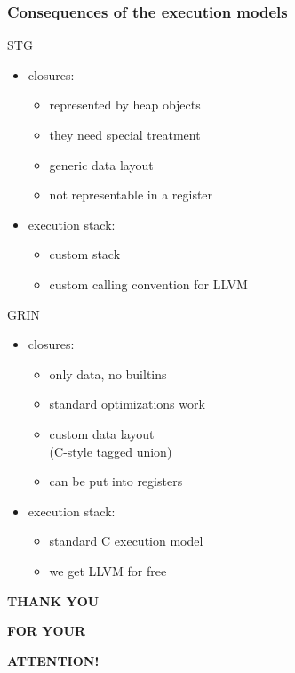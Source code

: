 \documentclass[bigger,aspectratio=169]{beamer}
\begin{document}
\begin{frame}
\frametitle{Consequences of the execution models}

\begin{minipage}{0.45\textwidth}
	\vspace{0.3cm}
	\begin{center}
		STG
	\end{center}
	\begin{itemize}
		\item<1-> closures:
		\begin{itemize}
			\item<2-> represented by heap objects
			\item<3-> they need special treatment
			\item<4-> generic data layout
			\item<5-> not representable in a register
		\end{itemize}
		\item<6-> execution stack:
		\begin{itemize}
			\item<7-> custom stack
			\item<8-> custom calling convention for LLVM
		\end{itemize}
	\end{itemize}
\end{minipage}
\hfill
\begin{minipage}{0.45\textwidth}
	\begin{center}
		GRIN
	\end{center}
	\begin{itemize}
		\item<9-> closures:
		\begin{itemize}[leftmargin=-2cm]
			\item<10-> only data, no builtins
			\item<11-> standard optimizations work
			\item<12-> custom data layout \\(C-style tagged union)
			\item<13-> can be put into registers
		\end{itemize}
		\item<14-> execution stack:
		\begin{itemize}
			\item<15-> standard C execution model
			\item<16-> we get LLVM for free
		\end{itemize}
	\end{itemize}
\end{minipage}

\end{frame}

{ %
	\begin{frame}{}
	
	\vspace{2cm}
	
	{\bf\Huge\color{white} THANK YOU}
	
	\bigskip
	
	{\bf\Huge\color{white} FOR YOUR}
	
	\bigskip
	
	{\bf\Huge\color{white} ATTENTION!}
	
 \end{frame}
}
\end{document}
